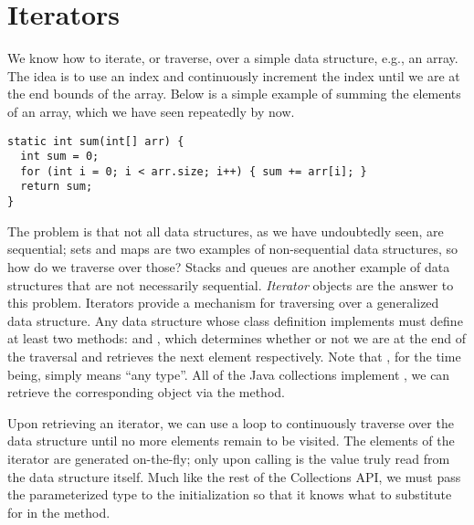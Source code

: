 \section*{Iterators}
We know how to iterate, or traverse, over a simple data structure, e.g., an array. The idea is to use an index and continuously increment the index until we are at the end bounds of the array. Below is a simple example of summing the elements of an array, which we have seen repeatedly by now.

\par{
\begin{verbatim}
static int sum(int[] arr) {
  int sum = 0;
  for (int i = 0; i < arr.size; i++) { sum += arr[i]; }
  return sum;
}
\end{verbatim}
}

The problem is that not all data structures, as we have undoubtedly seen, are sequential; sets and maps are two examples of non-sequential data structures, so how do we traverse over those? Stacks and queues are another example of data structures that are not necessarily sequential. \textit{Iterator} objects are the answer to this problem. Iterators provide a mechanism for traversing over a generalized data structure. Any data structure whose class definition implements  must define at least two methods:  and , which determines whether or not we are at the end of the traversal and retrieves the next element respectively. Note that , for the time being, simply means ``any type''. All of the Java collections implement , we can retrieve the corresponding  object via the  method. 

Upon retrieving an iterator, we can use a  loop to continuously traverse over the data structure until no more elements remain to be visited. The elements of the iterator are generated on-the-fly; only upon calling  is the value truly read from the data structure itself. Much like the rest of the Collections API, we must pass the parameterized type to the  initialization so that it knows what to substitute for  in the  method.


